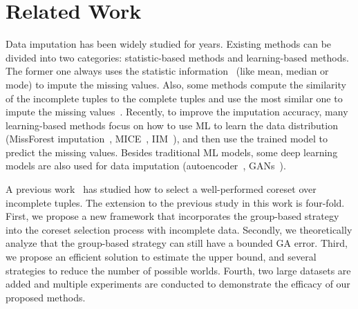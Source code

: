 \section{Related Work}\label{sec:related}

Data imputation has been widely studied for  years. Existing  methods can be divided into two categories: statistic-based methods and learning-based methods. The former one always uses the statistic information~\cite{DBLP:journals/tsmc/FarhangfarKP07, DBLP:conf/sigmod/MayfieldNP10} (like mean, median or mode) to impute the missing values. Also, some methods compute the similarity of the incomplete tuples to the complete tuples and use the most similar one to impute the missing values~\cite{altman1992introduction, DBLP:journals/artmed/JerezMGARMF10, DBLP:conf/isese/TwalaCS05}. Recently, to improve the imputation accuracy,   many learning-based methods focus on how to use ML to learn the data distribution (\eg MissForest imputation~\cite{DBLP:journals/bioinformatics/StekhovenB12}, MICE~\cite{royston2011multiple},  IIM~\cite{DBLP:conf/icde/ZhangSSW19}), and then  use the trained model to predict the missing values. Besides traditional ML models, some deep learning models are also used for data imputation (\eg  autoencoder~\cite{DBLP:journals/corr/GondaraW17, mccoy2018variational, DBLP:journals/pr/NazabalOGV20}, GANs~\cite{DBLP:journals/nn/SpinelliSU20, DBLP:conf/icml/YoonJS18}).
 
 A previous work~\cite{} has studied how to select a well-performed coreset over incomplete tuples. The extension to the previous study in this work is four-fold. First, we propose a new framework that incorporates the group-based strategy into the coreset selection process with incomplete data. Secondly, we theoretically analyze that the group-based strategy can still have a bounded GA error. Third, we propose an efficient solution to estimate the upper bound, and several strategies to reduce the number of possible worlds. Fourth, two large datasets are added and multiple experiments are conducted to demonstrate the efficacy of our proposed methods. 

